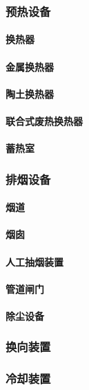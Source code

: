 \documentclass[UTF8]{../../ApplicationUniverse}
\begin{document}
        \subsubsection{预热设备}
            \paragraph{换热器}
            \paragraph{金属换热器}
            \paragraph{陶土换热器}
            \paragraph{联合式废热换热器}
            \paragraph{蓄热室}
        \subsubsection{排烟设备}
            \paragraph{烟道}
            \paragraph{烟囱}
            \paragraph{人工抽烟装置}
            \paragraph{管道闸门}
            \paragraph{除尘设备}
        \subsubsection{换向装置}
        \subsubsection{冷却装置}
\end{document}

